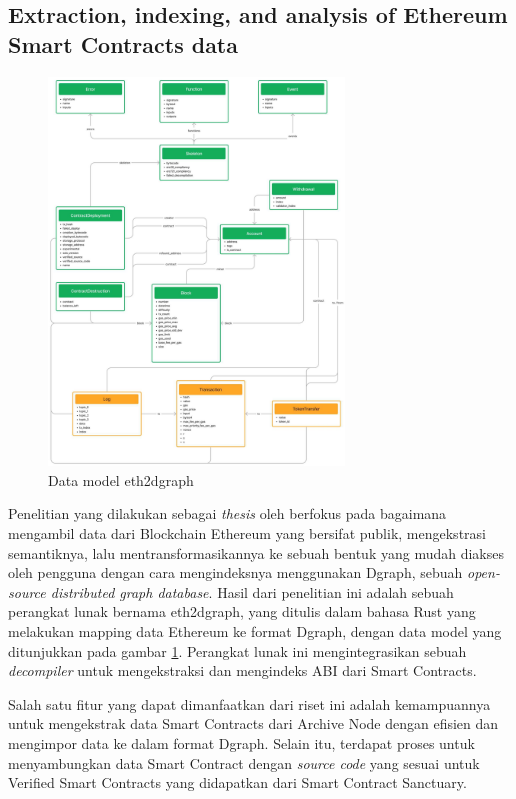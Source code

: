 \subsection{Extraction, indexing, and analysis of Ethereum Smart Contracts data}
\label{subsec:extraction-indexing-analysis-ethereum-sc}

\begin{figure}[ht]
	\centering
	\includegraphics[width=0.7\textwidth]{resources/chapter-2/eth2dgraph-structure.jpg}
	\caption{Data model eth2dgraph \parencite{aimar2023extraction}}
	\label{image:eth2dgraph-structure}
\end{figure}

Penelitian yang dilakukan sebagai \textit{thesis} oleh \cite{aimar2023extraction} berfokus pada bagaimana mengambil data dari Blockchain Ethereum yang bersifat publik, mengekstrasi semantiknya, lalu mentransformasikannya ke sebuah bentuk yang mudah diakses oleh pengguna dengan cara mengindeksnya menggunakan Dgraph, sebuah \textit{open-source distributed graph database}. Hasil dari penelitian ini adalah sebuah perangkat lunak bernama eth2dgraph, yang ditulis dalam bahasa Rust yang melakukan mapping data Ethereum ke format Dgraph, dengan data model yang ditunjukkan pada gambar \ref{image:eth2dgraph-structure}. Perangkat lunak ini mengintegrasikan sebuah \textit{decompiler} untuk mengekstraksi dan mengindeks ABI dari Smart Contracts.

Salah satu fitur yang dapat dimanfaatkan dari riset ini adalah kemampuannya untuk mengekstrak data Smart Contracts dari Archive Node dengan efisien dan mengimpor data ke dalam format Dgraph. Selain itu, terdapat proses untuk menyambungkan data Smart Contract dengan \textit{source code} yang sesuai untuk Verified Smart Contracts yang didapatkan dari Smart Contract Sanctuary.

